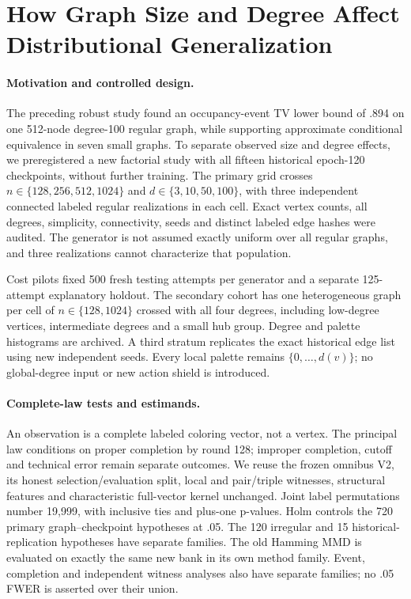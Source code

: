 \clearpage
\section{How Graph Size and Degree Affect Distributional Generalization}
\label{sec:factorial}
\paragraph{Motivation and controlled design.}
The preceding robust study found an occupancy-event TV lower bound of .894
on one 512-node degree-100 regular graph, while supporting approximate
conditional equivalence in seven small graphs. To separate observed size and
degree effects, we preregistered a new factorial study with all fifteen
historical epoch-120 checkpoints, without further training. The primary grid
crosses $n\in\{128,256,512,1024\}$ and $d\in\{3,10,50,100\}$, with three
independent connected labeled regular realizations in each cell. Exact vertex
counts, all degrees, simplicity, connectivity, seeds and distinct labeled
edge hashes were audited. The generator is not assumed exactly uniform over
all regular graphs, and three realizations cannot characterize that population.

Cost pilots fixed 500 fresh testing attempts per generator and a separate
125-attempt explanatory holdout. The secondary cohort has one heterogeneous
graph per cell of $n\in\{128,1024\}$ crossed with all four degrees, including
low-degree vertices, intermediate degrees and a small hub group. Degree and
palette histograms are archived. A third stratum replicates the exact
historical edge list using new independent seeds. Every local palette remains
$\{0,\ldots,d(v)\}$; no global-degree input or new action shield is introduced.

\paragraph{Complete-law tests and estimands.}
An observation is a complete labeled coloring vector, not a vertex. The
principal law conditions on proper completion by round 128; improper
completion, cutoff and technical error remain separate outcomes. We reuse
the frozen omnibus V2, its honest selection/evaluation split, local and
pair/triple witnesses, structural features and characteristic full-vector
kernel unchanged. Joint label permutations number 19,999, with inclusive
ties and plus-one p-values. Holm controls the 720 primary graph--checkpoint
hypotheses at .05. The 120 irregular and 15 historical-replication hypotheses
have separate families. The old Hamming MMD is evaluated on exactly the same
new bank in its own method family. Event, completion and independent witness
analyses also have separate families; no .05 FWER is asserted over their union.

